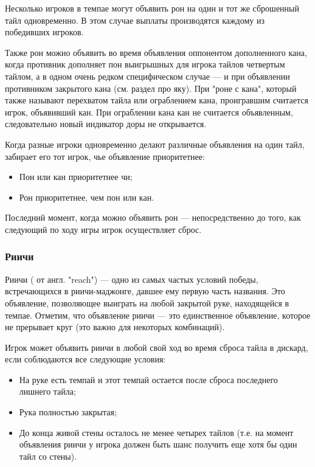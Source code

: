Несколько игроков в темпае могут объявить рон на один и тот же сброшенный тайл одновременно. В этом случае выплаты производятся каждому из победивших игроков. 

Также рон можно объявить во время объявления оппонентом дополненного кана, когда противник дополняет пон выигрышных для игрока тайлов четвертым тайлом, а в одном очень редком специфическом случае --- и при объявлении противником закрытого кана (см. раздел про яку). При "роне с кана", который также называют перехватом тайла или ограблением кана, проигравшим считается игрок, объявивший кан. При ограблении кана кан не считается объявленным, следовательно новый индикатор доры не открывается.

Когда разные игроки одновременно делают различные объявления на один тайл, забирает его тот игрок, чье объявление приоритетнее:

\begin{itemize}
	\item Пон или кан приоритетнее чи;
	\item Рон приоритетнее, чем пон или кан.
\end{itemize}

Последний момент, когда можно объявить рон --- непосредственно до того, как следующий по ходу игры игрок осуществляет сброс.

\subsubsection{Риичи}

Риичи ( от англ. "reach") --- одно из самых частых условий победы, встречающихся в риичи-маджонге, давшее ему первую часть названия. Это объявление, позволяющее выиграть на любой закрытой руке, находящейся в темпае. Отметим, что объявление риичи --- это единственное объявление, которое не прерывает круг (это важно для некоторых комбинаций).

Игрок может объявить риичи в любой свой ход во время сброса тайла в дискард, если соблюдаются все следующие условия:

\begin{itemize}
	\item На руке есть темпай и этот темпай остается после сброса последнего лишнего тайла;
	\item Рука полностью закрытая;
	\item До конца живой стены осталось не менее четырех тайлов (т.е. на момент объявления риичи у игрока должен быть шанс получить еще хотя бы один тайл со стены).
\end{itemize}

